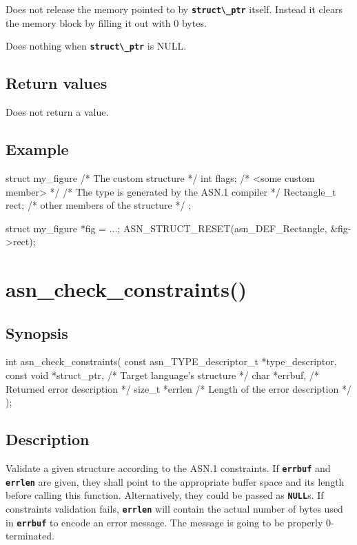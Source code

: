 \documentclass[english,oneside,12pt]{book}
\newcommand{\apisection}[2]{\clearpage\section{\label{#1}#2}}
\newcommand{\code}[1]{\texttt{\textbf{\lstinline{#1}}}}
\begin{document}
Does not release the memory pointed to by \code{struct\_ptr} itself.
Instead it clears the memory block by filling it out with 0 bytes.

Does nothing when \code{struct\_ptr} is NULL.

\subsection*{Return values}
Does not return a value.

\subsection*{Example}

\begin{example}
struct my_figure {       /* The custom structure */
    int flags;           /* <some custom member> */
    /* The type is generated by the ASN.1 compiler */
    Rectangle_t rect;
    /* other members of the structure */
};

struct my_figure *fig = ...;
ASN_STRUCT_RESET(asn_DEF_Rectangle, &fig->rect);
\end{example}

\apisection{sec:asn_check_constraints}{asn\_check\_constraints()}

\subsection*{Synopsis}

\begin{signature}
int asn_check_constraints(
    const asn_TYPE_descriptor_t *type_descriptor,
    const void *struct_ptr, /* Target language's structure */
    char *errbuf,           /* Returned error description */
    size_t *errlen          /* Length of the error description */
);
\end{signature}

\subsection*{Description}

Validate a given structure according to the ASN.1 constraints.
If \code{errbuf} and \code{errlen} are given, they shall point to the
appropriate buffer space and its length before calling this function.
Alternatively, they could be passed as \code{NULL}s.
If constraints validation fails, \code{errlen} will contain the actual
number of bytes used in \code{errbuf} to encode an error message.
The message is going to be properly 0-terminated.
\end{document}
